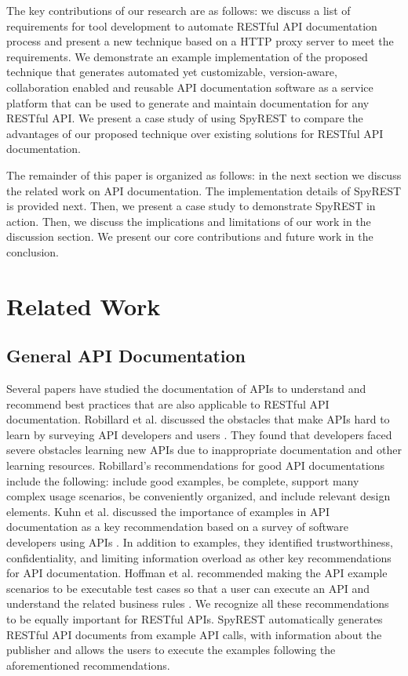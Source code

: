 \documentclass[conference]{IEEEtran}
\begin{document}
The key contributions of our research are as follows: we discuss a list of requirements for tool development to automate RESTful API documentation process and present a new technique based on a HTTP proxy server to meet the requirements. We demonstrate an example implementation of the proposed technique that generates automated yet customizable, version-aware, collaboration enabled and reusable API documentation software as a service platform that can be used to generate and maintain documentation for any RESTful API. We present a case study of using SpyREST to compare the advantages of our proposed technique over existing solutions for RESTful API documentation.

The remainder of this paper is organized as follows: in the next section we discuss the related work on API documentation. The implementation details of SpyREST is provided next. Then, we present a case study to demonstrate SpyREST in action. Then, we discuss the implications and limitations of our work in the discussion section. We present our core contributions and future work in the conclusion.


\section{Related Work} %
\label{sec:related_work}
\subsection{General API Documentation} %
\label{ssub:api_learnability}
Several papers have studied the documentation of APIs to understand and recommend best practices that are also applicable to RESTful API documentation. Robillard et al. discussed the obstacles that make APIs hard to learn by surveying API developers and users \cite{Robillard_what_makes} \cite{Robillard_a_field_study}. They found that  developers faced severe obstacles learning new APIs due to inappropriate documentation and other learning resources. Robillard's recommendations for good API documentations include the following: include good examples, be complete, support many complex usage scenarios, be conveniently organized, and include relevant design elements. Kuhn et al. discussed the importance of examples in API documentation as a key recommendation based on a survey of software developers using APIs \cite{Kuhn_on_designing}. In addition to examples, they identified trustworthiness, confidentiality, and limiting information overload as other key recommendations for API documentation. Hoffman et al. recommended making the API example scenarios to be executable test cases so that a user can execute an API and understand the related business rules \cite{Hoffman_api_documentation}. We recognize all these recommendations to be equally important for RESTful APIs. SpyREST automatically generates RESTful API documents from example API calls, with information about the publisher and allows the users to execute the examples following the aforementioned recommendations.
\end{document}

